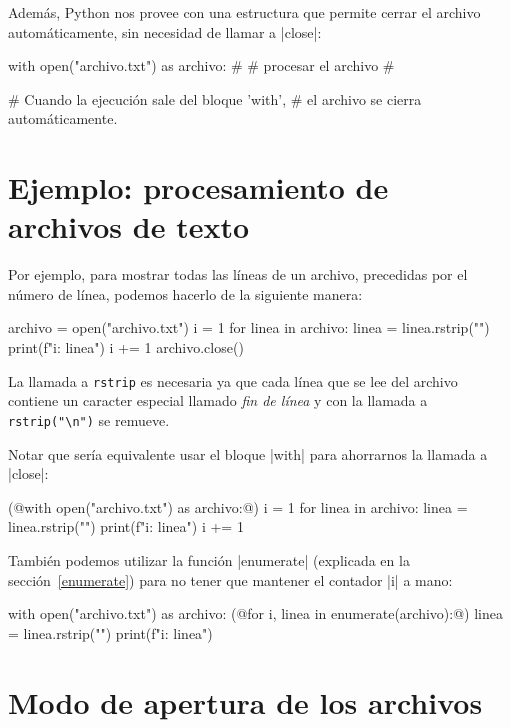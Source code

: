 Además, Python nos provee con una estructura que permite cerrar el archivo
automáticamente, sin necesidad de llamar a |close|:

\begin{codigo-python-sn}
with open("archivo.txt") as archivo:
    #
    # procesar el archivo
    #

# Cuando la ejecución sale del bloque 'with',
# el archivo se cierra automáticamente.
\end{codigo-python-sn}

\section{Ejemplo: procesamiento de archivos de texto}

Por ejemplo, para mostrar todas las líneas de un archivo,
precedidas por el número de línea, podemos hacerlo de la siguiente manera:

\begin{codigo-python-sn}
archivo = open("archivo.txt")
i = 1
for linea in archivo:
    linea = linea.rstrip("\n")
    print(f"{i}: {linea}")
    i += 1
archivo.close()
\end{codigo-python-sn}

La llamada a \lstinline!rstrip! es necesaria ya que cada línea que se lee del
archivo contiene un caracter especial llamado \emph{fin de línea} y con la llamada a
\lstinline!rstrip("\n")! se remueve.

Notar que sería equivalente usar el bloque |with| para ahorrarnos la llamada a
|close|:

\begin{codigo-python-sn}
(@with open("archivo.txt") as archivo:@)
    i = 1
    for linea in archivo:
        linea = linea.rstrip("\n")
        print(f"{i}: {linea}")
        i += 1
\end{codigo-python-sn}

También podemos utilizar la función |enumerate| (explicada en la
sección~\ref{enumerate}) para no tener que mantener el
contador |i| a mano:

\begin{codigo-python-sn}
with open("archivo.txt") as archivo:
    (@for i, linea in enumerate(archivo):@)
        linea = linea.rstrip("\n")
        print(f"{i}: {linea}")
\end{codigo-python-sn}

\section{Modo de apertura de los archivos}

